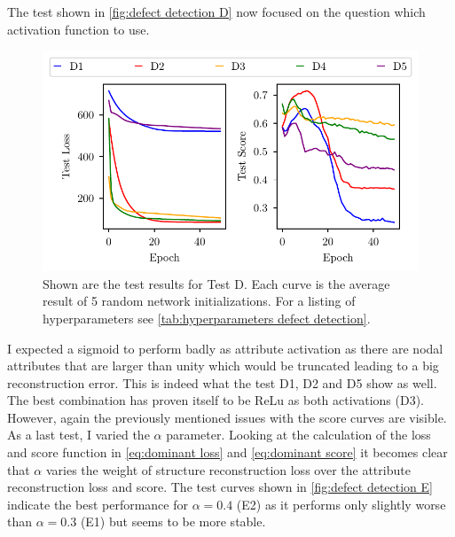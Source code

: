 \documentclass[11pt,a4paper]{article}
\begin{document}
The test shown in \autoref{fig:defect detection D} now focused on the question which activation function to use. 
\begin{figure}[htbp]
\centering
\includegraphics{images/plots/defect_detection_D.pdf}
\caption{Shown are the test results for Test D. Each curve is the average result of 5 random network initializations. For a listing of hyperparameters see \autoref{tab:hyperparameters defect detection}.}
\label{fig:defect detection D}
\end{figure}
I expected a sigmoid to perform badly as attribute activation as there are nodal attributes that are larger than unity which would be truncated leading to a big reconstruction error. 
This is indeed what the test D1, D2 and D5 show as well. 
The best combination has proven itself to be ReLu as both activations (D3). 
However, again the previously mentioned issues with the score curves are visible. \\


As a last test, I varied the $\alpha$ parameter. 
Looking at the calculation of the loss and score function in \autoref{eq:dominant loss} and \autoref{eq:dominant score} it becomes clear that $\alpha$ varies the weight of structure reconstruction loss over the attribute reconstruction loss and score. 
The test curves shown in \autoref{fig:defect detection E} indicate the best performance for $\alpha=0.4$ (E2) as it performs only slightly worse than $\alpha=0.3$ (E1) but seems to be more stable. \\
\end{document}
